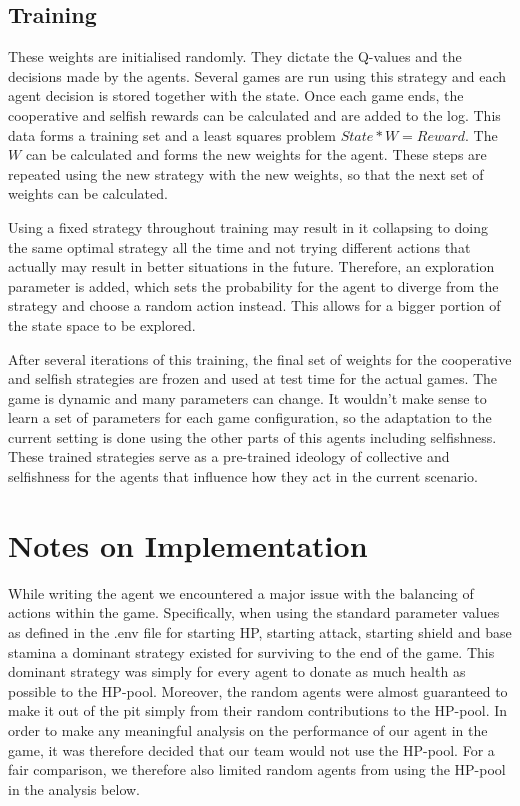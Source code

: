 \subsection{Training}
These weights are initialised randomly. They dictate the Q-values and the decisions made by the agents. Several games are run using this strategy and each agent decision is stored together with the state. Once each game ends, the cooperative and selfish rewards can be calculated and are added to the log. This data forms a training set and a least squares problem $State * W = Reward$. The $W$ can be calculated and forms the new weights for the agent. These steps are repeated using the new strategy with the new weights, so that the next set of weights can be calculated.

Using a fixed strategy throughout training may result in it collapsing to doing the same optimal strategy all the time and not trying different actions that actually may result in better situations in the future. Therefore, an exploration parameter is added, which sets the probability for the agent to diverge from the strategy and choose a random action instead. This allows for a bigger portion of the state space to be explored.

After several iterations of this training, the final set of weights for the cooperative and selfish strategies are frozen and used at test time for the actual games. The game is dynamic and many parameters can change. It wouldn't make sense to learn a set of parameters for each game configuration, so the adaptation to the current setting is done using the other parts of this agents including selfishness. These trained strategies serve as a pre-trained ideology of collective and selfishness for the agents that influence how they act in the current scenario.



\section{Notes on Implementation}

While writing the agent we encountered a major issue with the balancing of actions within the game. Specifically, when using the standard parameter values as defined in the .env file for starting HP, starting attack, starting shield and base stamina a dominant strategy existed for surviving to the end of the game. This dominant strategy was simply for every agent to donate as much health as possible to the HP-pool. Moreover, the random agents were almost guaranteed to make it out of the pit simply from their random contributions to the HP-pool. In order to make any meaningful analysis on the performance of our agent in the game, it was therefore decided that our team would not use the HP-pool. For a fair comparison, we therefore also limited random agents from using the HP-pool in the analysis below.


